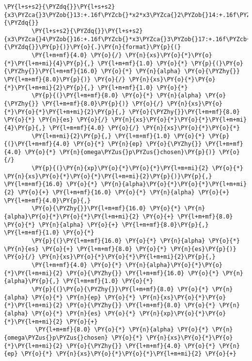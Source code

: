 \begin{Verbatim}[commandchars=\\\{\}]
        \PY{l+s+s2}{\PYZdq{}}\PY{l+s+s2}{x3\PYZca{}3\PYZob{}13:+.16f\PYZcb{}*x2*x3\PYZca{}2\PYZob{}14:+.16f\PYZcb{}*x2*x3\PYZob{}15:+.16f\PYZcb{}*}\PY{l+s+s2}{\PYZdq{}}
        \PY{l+s+s2}{\PYZdq{}}\PY{l+s+s2}{x3\PYZca{}4\PYZob{}16:+.16f\PYZcb{}*x3\PYZca{}3\PYZob{}17:+.16f\PYZcb{}*x3\PYZca{}2\PYZob{}18:+.16f\PYZcb{}*x3;}\PY{l+s+s2}{\PYZdq{}}\PY{p}{)}\PY{o}{.}\PY{n}{format}\PY{p}{(}
        \PY{l+m+mf}{4.0} \PY{o}{/} \PY{n}{xs}\PY{o}{*}\PY{o}{*}\PY{l+m+mi}{4}\PY{p}{,} \PY{l+m+mf}{1.0} \PY{o}{*} \PY{p}{(}\PY{o}{\PYZhy{}}\PY{l+m+mf}{16.0} \PY{o}{*} \PY{n}{alpha} \PY{o}{\PYZhy{}} \PY{l+m+mf}{8.0}\PY{p}{)} \PY{o}{/} \PY{n}{xs}\PY{o}{*}\PY{o}{*}\PY{l+m+mi}{2}\PY{p}{,} \PY{l+m+mf}{1.0} \PY{o}{*}
        \PY{p}{(}\PY{l+m+mf}{8.0} \PY{o}{*} \PY{n}{alpha} \PY{o}{\PYZhy{}} \PY{l+m+mf}{8.0}\PY{p}{)} \PY{o}{/} \PY{n}{xs}\PY{o}{*}\PY{o}{*}\PY{l+m+mi}{2}\PY{p}{,} \PY{o}{\PYZhy{}}\PY{l+m+mf}{8.0} \PY{o}{*} \PY{n}{es} \PY{o}{/} \PY{n}{xs}\PY{o}{*}\PY{o}{*}\PY{l+m+mi}{4}\PY{p}{,} \PY{l+m+mf}{4.0} \PY{o}{/} \PY{n}{xs}\PY{o}{*}\PY{o}{*}
        \PY{l+m+mi}{2}\PY{p}{,} \PY{l+m+mf}{1.0} \PY{o}{*} \PY{p}{(}\PY{l+m+mf}{4.0} \PY{o}{*} \PY{n}{ep} \PY{o}{\PYZhy{}} \PY{l+m+mf}{4.0} \PY{o}{*} \PY{n}{omega\PYZus{}p\PYZus{}chosen}\PY{p}{)} \PY{o}{/}
        \PY{p}{(}\PY{n}{xp}\PY{o}{*}\PY{o}{*}\PY{l+m+mi}{2} \PY{o}{*} \PY{n}{xs}\PY{o}{*}\PY{o}{*}\PY{l+m+mi}{2}\PY{p}{)}\PY{p}{,} \PY{l+m+mf}{16.0} \PY{o}{*} \PY{n}{alpha}\PY{o}{*}\PY{o}{*}\PY{l+m+mi}{2} \PY{o}{+} \PY{l+m+mf}{16.0} \PY{o}{*} \PY{n}{alpha} \PY{o}{+} \PY{l+m+mf}{4.0}\PY{p}{,}
        \PY{o}{\PYZhy{}}\PY{l+m+mf}{16.0} \PY{o}{*} \PY{n}{alpha}\PY{o}{*}\PY{o}{*}\PY{l+m+mi}{2} \PY{o}{+} \PY{l+m+mf}{8.0} \PY{o}{*} \PY{n}{alpha} \PY{o}{+} \PY{l+m+mf}{8.0}\PY{p}{,} \PY{l+m+mf}{1.0} \PY{o}{*}
        \PY{p}{(}\PY{l+m+mf}{16.0} \PY{o}{*} \PY{n}{alpha} \PY{o}{*} \PY{n}{es} \PY{o}{+} \PY{l+m+mf}{8.0} \PY{o}{*} \PY{n}{es}\PY{p}{)} \PY{o}{/} \PY{n}{xs}\PY{o}{*}\PY{o}{*}\PY{l+m+mi}{2}\PY{p}{,}
        \PY{l+m+mf}{4.0} \PY{o}{*} \PY{n}{alpha}\PY{o}{*}\PY{o}{*}\PY{l+m+mi}{2} \PY{o}{\PYZhy{}} \PY{l+m+mf}{16.0} \PY{o}{*} \PY{n}{alpha}\PY{p}{,} \PY{l+m+mf}{1.0} \PY{o}{*}
        \PY{p}{(}\PY{o}{\PYZhy{}}\PY{l+m+mf}{8.0} \PY{o}{*} \PY{n}{alpha} \PY{o}{*} \PY{n}{ep} \PY{o}{*} \PY{n}{xs}\PY{o}{*}\PY{o}{*}\PY{l+m+mi}{2} \PY{o}{\PYZhy{}} \PY{l+m+mf}{8.0} \PY{o}{*} \PY{n}{alpha} \PY{o}{*} \PY{n}{es} \PY{o}{*} \PY{n}{xp}\PY{o}{*}\PY{o}{*}\PY{l+m+mi}{2} \PY{o}{+}
         \PY{l+m+mf}{8.0} \PY{o}{*} \PY{n}{alpha} \PY{o}{*} \PY{n}{omega\PYZus{}p\PYZus{}chosen} \PY{o}{*} \PY{n}{xs}\PY{o}{*}\PY{o}{*}\PY{l+m+mi}{2} \PY{o}{\PYZhy{}} \PY{l+m+mf}{4.0} \PY{o}{*} \PY{n}{ep} \PY{o}{*} \PY{n}{xs}\PY{o}{*}\PY{o}{*}\PY{l+m+mi}{2} \PY{o}{+}

\end{Verbatim}
